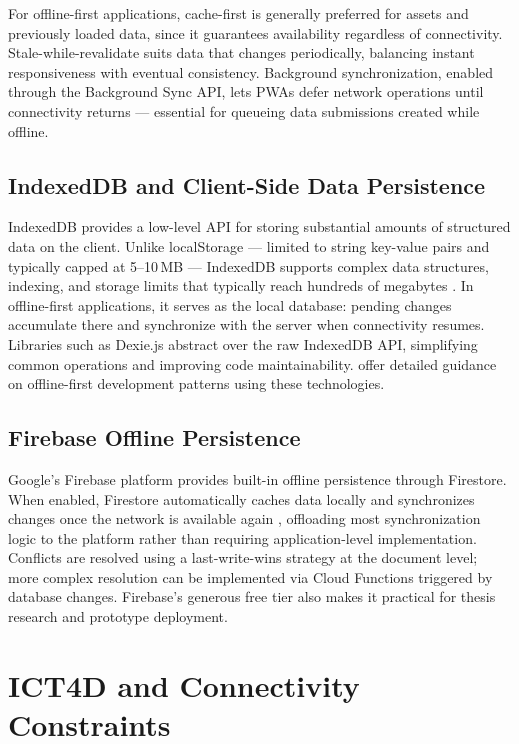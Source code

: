 For offline-first applications, cache-first is generally preferred for assets and previously loaded data, since it guarantees availability regardless of connectivity. Stale-while-revalidate suits data that changes periodically, balancing instant responsiveness with eventual consistency. Background synchronization, enabled through the Background Sync API, lets PWAs defer network operations until connectivity returns --- essential for queueing data submissions created while offline.

\subsection{IndexedDB and Client-Side Data Persistence}

IndexedDB provides a low-level API for storing substantial amounts of structured data on the client. Unlike localStorage --- limited to string key-value pairs and typically capped at 5--10\,MB --- IndexedDB supports complex data structures, indexing, and storage limits that typically reach hundreds of megabytes \citep{MDN2024}. In offline-first applications, it serves as the local database: pending changes accumulate there and synchronize with the server when connectivity resumes. Libraries such as Dexie.js \citep{Dexie2024} abstract over the raw IndexedDB API, simplifying common operations and improving code maintainability. \citet{Nicoara2018} offer detailed guidance on offline-first development patterns using these technologies.

\subsection{Firebase Offline Persistence}

Google's Firebase platform provides built-in offline persistence through Firestore. When enabled, Firestore automatically caches data locally and synchronizes changes once the network is available again \citep{GoogleFirebase2024}, offloading most synchronization logic to the platform rather than requiring application-level implementation. Conflicts are resolved using a last-write-wins strategy at the document level; more complex resolution can be implemented via Cloud Functions triggered by database changes. Firebase's generous free tier also makes it practical for thesis research and prototype deployment.

\section{ICT4D and Connectivity Constraints}

